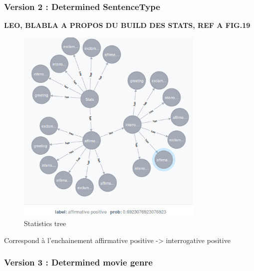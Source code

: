 \subsubsection{Version 2 : Determined SentenceType}
\label{sssec:v_stype}
\textbf{LEO, BLABLA A PROPOS DU BUILD DES STATS, REF A FIG.19}
\begin{figure}[!h]
\begin{center}
\includegraphics[width=0.80\textwidth]{./img/stats.png}
\end{center}
\caption{Statistics tree}
\label{fig:stats}
\end{figure}
Correspond à l'enchainement affirmative positive -> interrogative positive
\subsubsection{Version 3 : Determined movie genre}
\label{sssec:v_genre}
